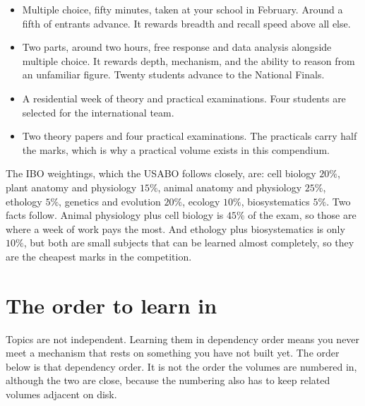 \begin{keybox}[title={The competition, stage by stage}]
\begin{itemize}
\item {} Multiple choice, fifty minutes, taken at your school in
      February. Around a fifth of entrants advance. It rewards breadth and recall
      speed above all else.
\item {} Two parts, around two hours, free response and data
      analysis alongside multiple choice. It rewards depth, mechanism, and the ability
      to reason from an unfamiliar figure. Twenty students advance to the National
      Finals.
\item {} A residential week of theory and practical
      examinations. Four students are selected for the international team.
\item {} Two theory papers and four practical examinations. The practicals
      carry half the marks, which is why a practical volume exists in this compendium.
\end{itemize}
\end{keybox}

\begin{obsbox}[title={WORTH NOTICING: the official topic weightings}]
The IBO weightings, which the USABO follows closely, are: cell biology $20\%$, plant
anatomy and physiology $15\%$, animal anatomy and physiology $25\%$, ethology $5\%$,
genetics and evolution $20\%$, ecology $10\%$, biosystematics $5\%$. Two facts follow.
Animal physiology plus cell biology is $45\%$ of the exam, so those are where a week of
work pays the most. And ethology plus biosystematics is only $10\%$, but both are small
subjects that can be learned almost completely, so they are the cheapest marks in the
competition.
\end{obsbox}

\section{The order to learn in}

Topics are not independent. Learning them in dependency order means you never meet a
mechanism that rests on something you have not built yet. The order below is that
dependency order. It is not the order the volumes are numbered in, although the two are
close, because the numbering also has to keep related volumes adjacent on disk.

